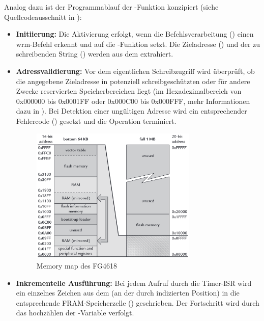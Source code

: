\newpage
Analog dazu ist der Programmablauf der -Funktion konzipiert (siehe Quellcodeausschnitt in ):
\begin{itemize}
	\item \textbf{Initiierung:} Die Aktivierung erfolgt, wenn die Befehlsverarbeitung () einen \glqq{}wrm\grqq{}-Befehl erkennt und  auf die -Funktion setzt. Die Zieladresse () und der zu schreibenden String () werden aus dem  extrahiert.
	
	\item \textbf{Adressvalidierung:} Vor dem eigentlichen Schreibzugriff wird \"uberpr\"uft, ob die angegebene Zieladresse in potenziell schreibgesch\"utzten oder f\"ur andere Zwecke reservierten Speicherbereichen liegt (\zB im Hexadezimalbereich von 0x000000 bis 0x0001FF oder 0x000C00 bis 0x000FFF, mehr Informationen dazu in ). Bei Detektion einer ung\"ultigen Adresse wird ein entsprechender Fehlercode () gesetzt und die Operation terminiert.
	
	\begin{figure}[h!]
		\centering
		\includegraphics[width=0.75\textwidth]{../Bilder/memory_map.png}
		\caption{Memory map des FG4618 }
		\label{fig:memory_map}
	\end{figure}
	
	\item \textbf{Inkrementelle Ausf\"uhrung:} Bei jedem Aufruf durch die Timer-ISR wird ein einzelnes Zeichen aus dem  (an der durch  indizierten Position) in die entsprechende FRAM-Speicherzelle () geschrieben. Der Fortschritt wird durch das hochz\"ahlen der -Variable verfolgt.
	

\end{itemize}

